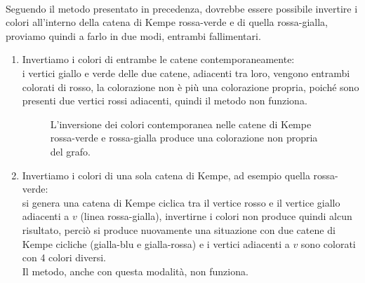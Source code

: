 \documentclass[a4paper,12pt,titlepage]{report}
\begin{document}
    \\Seguendo il metodo presentato in precedenza, dovrebbe essere possibile invertire i colori all'interno della catena di Kempe rossa-verde e di quella rossa-gialla, proviamo quindi a farlo in due modi, entrambi fallimentari.
    \begin{enumerate}
    	\item Invertiamo i colori di entrambe le catene contemporaneamente:
    	\\i vertici giallo e verde delle due catene, adiacenti tra loro, vengono entrambi colorati di rosso, la colorazione non è più una colorazione propria, poiché sono presenti due vertici rossi adiacenti, quindi il metodo non funziona.
    	\begin{figure}[h]
    		\centering
    		\vspace{0.5cm}
    		\caption{L'inversione dei colori contemporanea nelle catene di Kempe rossa-verde e rossa-gialla produce una colorazione non propria del grafo.}
    	\end{figure}
    	\item Invertiamo i colori di una sola catena di Kempe, ad esempio quella rossa-verde:
    	\\si genera una catena di Kempe ciclica tra il vertice rosso e il vertice giallo adiacenti a $v$ (linea rossa-gialla), invertirne i colori non produce quindi alcun risultato, perciò si produce nuovamente una situazione con due catene di Kempe cicliche (gialla-blu e gialla-rossa) e i vertici adiacenti a $v$ sono colorati con 4 colori diversi.
    	\\Il metodo, anche con questa modalità, non funziona.

\end{enumerate}
\end{document}
